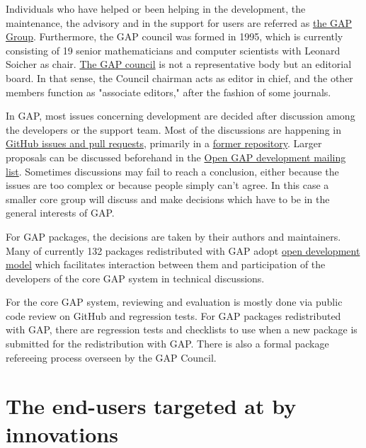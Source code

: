 \documentclass{deliverablereport}
\begin{document}
Individuals who have helped or been helping in the development, the maintenance, the advisory and in the support for users are referred as \href{https://www.gap-system.org/Contacts/People/people.html}{the GAP Group}.
Furthermore, the GAP council was formed in 1995, which is currently consisting of 19 senior mathematicians and computer scientists with Leonard Soicher as chair. \href{https://www.gap-system.org/Contacts/People/Council/council.html}{The GAP council} is not a representative body but an editorial board. In that sense, the Council chairman acts as editor in chief, and the other members function as "associate editors," after the fashion of some journals.

In GAP, most issues concerning development are decided after discussion among the developers or the support team. Most of the discussions are happening in \href{https://github.com/gap-system}{GitHub issues and pull requests}, primarily in a \href{https://github.com/gap-system/gap}{former repository}. Larger proposals can be discussed beforehand in the \href{http://mail.gap-system.org/mailman/listinfo/gap}{Open GAP development mailing list}. Sometimes discussions may fail to reach a conclusion, either because the issues are too complex or because people simply can’t agree. In this case a smaller core group will discuss and make decisions which have to be in the general interests of GAP. 

For GAP packages, the decisions are taken by their authors and maintainers. Many of currently 132 packages redistributed with GAP adopt \href{http://gap-packages.github.io/}{open development model} which facilitates interaction between them and participation of the developers of the core GAP system in technical discussions.

For the core GAP system, reviewing and evaluation is mostly done via public code review on GitHub and regression tests. For GAP packages redistributed with GAP, there are regression tests and checklists to use when a new package is submitted for the redistribution with GAP. There is also a formal package refereeing process overseen by the GAP Council.



\section{The end-users targeted at by innovations}
\end{document}
